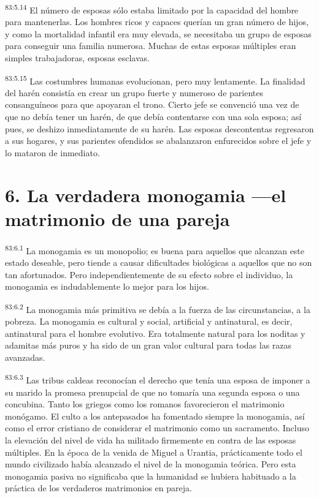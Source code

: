 \par
\textsuperscript{83:5.14} El número de esposas sólo estaba limitado por la capacidad del hombre para mantenerlas. Los hombres ricos y capaces querían un gran número de hijos, y como la mortalidad infantil era muy elevada, se necesitaba un grupo de esposas para conseguir una familia numerosa. Muchas de estas esposas múltiples eran simples trabajadoras, esposas esclavas.

\par
\textsuperscript{83:5.15} Las costumbres humanas evolucionan, pero muy lentamente. La finalidad del harén consistía en crear un grupo fuerte y numeroso de parientes consanguíneos para que apoyaran el trono. Cierto jefe se convenció una vez de que no debía tener un harén, de que debía contentarse con una sola esposa; así pues, se deshizo inmediatamente de su harén. Las esposas descontentas regresaron a sus hogares, y sus parientes ofendidos se abalanzaron enfurecidos sobre el jefe y lo mataron de inmediato.

\section*{6. La verdadera monogamia ---el matrimonio de una pareja}
\par
\textsuperscript{83:6.1} La monogamia es un monopolio; es buena para aquellos que alcanzan este estado deseable, pero tiende a causar dificultades biológicas a aquellos que no son tan afortunados. Pero independientemente de su efecto sobre el individuo, la monogamia es indudablemente lo mejor para los hijos.

\par
\textsuperscript{83:6.2} La monogamia más primitiva se debía a la fuerza de las circunstancias, a la pobreza. La monogamia es cultural y social, artificial y antinatural, es decir, antinatural para el hombre evolutivo. Era totalmente natural para los noditas y adamitas más puros y ha sido de un gran valor cultural para todas las razas avanzadas.

\par
\textsuperscript{83:6.3} Las tribus caldeas reconocían el derecho que tenía una esposa de imponer a su marido la promesa prenupcial de que no tomaría una segunda esposa o una concubina. Tanto los griegos como los romanos favorecieron el matrimonio monógamo. El culto a los antepasados ha fomentado siempre la monogamia, así como el error cristiano de considerar el matrimonio como un sacramento. Incluso la elevación del nivel de vida ha militado firmemente en contra de las esposas múltiples. En la época de la venida de Miguel a Urantia, prácticamente todo el mundo civilizado había alcanzado el nivel de la monogamia teórica. Pero esta monogamia pasiva no significaba que la humanidad se hubiera habituado a la práctica de los verdaderos matrimonios en pareja.

